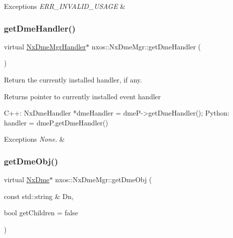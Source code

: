 \begin{DoxyExceptions}{Exceptions}
{\em E\+R\+R\+\_\+\+I\+N\+V\+A\+L\+I\+D\+\_\+\+U\+S\+A\+GE} & \\
\hline
\end{DoxyExceptions}
\mbox{\label{classnxos_1_1_nx_dme_mgr_a4eb84500ef136c111650e385c8f29eb6}} 
\subsubsection{\texorpdfstring{get\+Dme\+Handler()}{getDmeHandler()}}
{\footnotesize\ttfamily virtual \mbox{\hyperlink{classnxos_1_1_nx_dme_mgr_handler}{Nx\+Dme\+Mgr\+Handler}}$\ast$ nxos\+::\+Nx\+Dme\+Mgr\+::get\+Dme\+Handler (\begin{DoxyParamCaption}{ }\end{DoxyParamCaption})\hspace{0.3cm}{\ttfamily [pure virtual]}}

Return the currently installed handler, if any. \begin{DoxyReturn}{Returns}
pointer to currently installed event handler 
\begin{DoxyCode}
C++:
   NxDmeHandler *dmeHandler = dmeP->getDmeHandler();
Python:
   handler = dmeP.getDmeHandler()
\end{DoxyCode}

\end{DoxyReturn}

\begin{DoxyExceptions}{Exceptions}
{\em None.} & \\
\hline
\end{DoxyExceptions}
\mbox{\label{classnxos_1_1_nx_dme_mgr_acf4e25cc54e1cb352c9c79bb7dfa4021}} 
\subsubsection{\texorpdfstring{get\+Dme\+Obj()}{getDmeObj()}}
{\footnotesize\ttfamily virtual \mbox{\hyperlink{classnxos_1_1_nx_dme}{Nx\+Dme}}$\ast$ nxos\+::\+Nx\+Dme\+Mgr\+::get\+Dme\+Obj (\begin{DoxyParamCaption}\item[{const std\+::string \&}]{Dn,  }\item[{bool}]{get\+Children = {\ttfamily false} }\end{DoxyParamCaption})\hspace{0.3cm}{\ttfamily [pure virtual]}}

